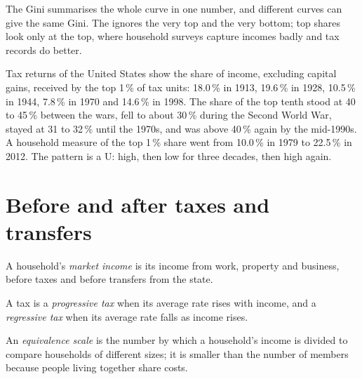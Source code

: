 The Gini summarises the whole curve in one number, and different curves can give the same Gini. The  ignores the very top and the very bottom; top
shares look only at the top, where household surveys capture incomes badly and tax records do better.

\begin{record}
Tax returns of the United States show the share of income, excluding capital gains, received by the top 1\,\% of tax units: 18.0\,\% in 1913, 19.6\,\% in 1928, 10.5\,\%
in 1944, 7.8\,\% in 1970 and 14.6\,\% in 1998. The share of the top tenth stood at 40 to 45\,\% between the wars, fell to about 30\,\% during the Second World War, stayed at
31 to 32\,\% until the 1970s, and was above 40\,\% again by the mid-1990s. A household measure of the top 1\,\% share went from 10.0\,\% in 1979 to 22.5\,\% in 2012. The
pattern is a U: high, then low for three decades, then high again.
\end{record}

\section{Before and after taxes and transfers}\label{sec:g11:inequality:redistribution}

\begin{definition}\label{def:g11:inequality:market-income}
A household's \emph{market income} is its income from work, property and business, before taxes and before transfers from the state.
\end{definition}

\begin{definition}\label{def:g11:inequality:progressive}
A tax is a \emph{progressive tax} when its average rate rises with income, and a \emph{regressive tax}\label{def:g11:inequality:regressive} when its average rate falls as income rises.
\end{definition}

\begin{definition}\label{def:g11:inequality:equivalence-scale}
An \emph{equivalence scale} is the number by which a household's income is divided to compare households of different sizes; it is smaller than
the number of members because people living together share costs.
\end{definition}

